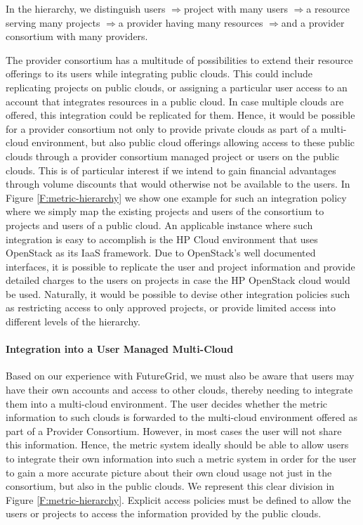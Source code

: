 \documentclass{tex/sig-alternate-2013}
\begin{document}
\newcommand{\ARROW}{$\Rightarrow$}

In the hierarchy, we distinguish users \ARROW project with many users \ARROW a resource serving many projects \ARROW a provider having many resources \ARROW and a provider consortium with many providers.

The provider consortium has a multitude of possibilities to extend their resource offerings to its users while integrating public clouds. This could include replicating projects on public clouds, or assigning a particular user access to an account that integrates resources in a public cloud. In case multiple clouds are offered, this integration could be replicated for them. Hence, it would be possible for a provider consortium not only to provide private clouds as part of a multi-cloud environment, but also public cloud offerings allowing access to these public clouds through a provider consortium managed project or users on the public clouds. This is of particular interest if we intend to gain financial advantages through volume discounts that would otherwise not be available to the users.  In Figure \ref{F:metric-hierarchy} we show one example for such an integration policy where we simply map the existing projects and users of the consortium to projects and users of a public cloud. An applicable instance where such integration is easy to accomplish is the HP Cloud environment that uses OpenStack as its IaaS framework. Due to OpenStack’s well documented interfaces, it is possible to replicate the user and project information and provide detailed charges to the users on projects in case the HP OpenStack cloud would be used. Naturally, it would be possible to devise other integration policies such as restricting access to only approved projects, or provide limited access into different levels of the hierarchy.


\paragraph{Integration into a User Managed Multi-Cloud}

Based on our experience with FutureGrid, we must also be aware that users may have their own accounts and access to other clouds, thereby needing to integrate them into a multi-cloud environment. The user decides whether the metric information to such clouds is forwarded to the multi-cloud environment offered as part of a Provider Consortium. However, in most cases the user will not share this information. Hence, the metric system ideally should be able to allow users to integrate their own information into such a metric system in order for the user to gain a more accurate picture about their own cloud usage not just in the consortium, but also in the public clouds. We represent this clear division in Figure \ref{F:metric-hierarchy}. Explicit access policies must be defined to allow the users or projects to access the information provided by the public clouds.
\end{document}
